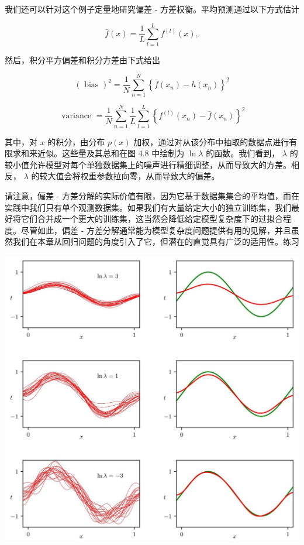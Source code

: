\documentclass[10pt]{article}
\begin{document}
我们还可以针对这个例子定量地研究偏差 - 方差权衡。平均预测通过以下方式估计

\[
\bar{f}\left( x\right)  = \frac{1}{L}\mathop{\sum }\limits_{{l = 1}}^{L}{f}^{\left( l\right) }\left( x\right) , \tag{4.50}
\]

然后，积分平方偏差和积分方差由下式给出

\[
{\left( \text{ bias }\right) }^{2} = \frac{1}{N}\mathop{\sum }\limits_{{n = 1}}^{N}{\left\{  \bar{f}\left( {x}_{n}\right)  - h\left( {x}_{n}\right) \right\}  }^{2} \tag{4.51}
\]

\[
\text{ variance } = \frac{1}{N}\mathop{\sum }\limits_{{n = 1}}^{N}\frac{1}{L}\mathop{\sum }\limits_{{l = 1}}^{L}{\left\{  {f}^{\left( l\right) }\left( {x}_{n}\right)  - \bar{f}\left( {x}_{n}\right) \right\}  }^{2} \tag{4.52}
\]

其中，对 \(x\) 的积分，由分布 \(p\left( x\right)\) 加权，通过对从该分布中抽取的数据点进行有限求和来近似。这些量及其总和在图 4.8 中绘制为 \(\ln \lambda\) 的函数。我们看到， \(\lambda\) 的较小值允许模型对每个单独数据集上的噪声进行精细调整，从而导致大的方差。相反， \(\lambda\) 的较大值会将权重参数拉向零，从而导致大的偏差。

请注意，偏差 - 方差分解的实际价值有限，因为它基于数据集集合的平均值，而在实践中我们只有单个观测数据集。如果我们有大量给定大小的独立训练集，我们最好将它们合并成一个更大的训练集，这当然会降低给定模型复杂度下的过拟合程度。尽管如此，偏差 - 方差分解通常能为模型复杂度问题提供有用的见解，并且虽然我们在本章从回归问题的角度引入了它，但潜在的直觉具有广泛的适用性。练习

\begin{center}
\includegraphics[max width=1.0\textwidth]{images/0194e279-9b28-703a-88f4-c3ac21e2010d_146_232_425_1333_1286_0.jpg}
\end{center}
\hspace*{3em} 
\end{document}
